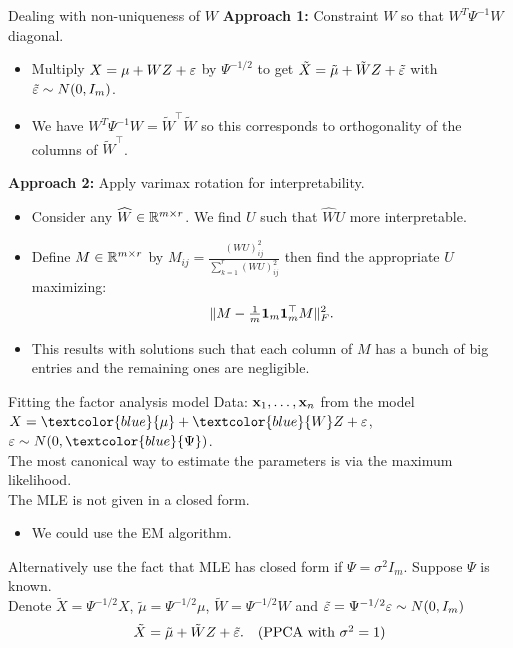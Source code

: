 \documentclass[11pt,handout,aspectratio=169]{beamer}
\begin{document}
\begin{frame}{Dealing with non-uniqueness of $W$}
\textbf{Approach 1: } Constraint $W$ so that $W^T\Psi^{-1}W$ diagonal.
    \begin{itemize}
        \item Multiply $X=\mu+WZ+\varepsilon$ by $\Psi^{-1/2}$ to get $\tilde X=\tilde \mu+\tilde WZ+\tilde {\varepsilon}$ with $\tilde{\varepsilon}\sim N(0,I_m)$.
        \item We have $W^T\Psi^{-1}W=\tilde W^\top \tilde W$ so this corresponds to orthogonality of the columns of $\tilde W^\top$.
    \end{itemize}
    \bigskip
    
    \textbf{Approach 2: } Apply \alert{varimax rotation} for interpretability.
    \begin{itemize}
    	\item Consider any $\widehat W\in \mathbb R^{m\times r}$. We find $U$ such that $\widehat WU$ more interpretable. 
    	\item Define $M\in \mathbb R^{m\times r}$ by $M_{ij}=\frac{(WU)_{ij}^2}{\sum_{k=1}^r (WU)_{ij}^2}$ then find the appropriate $U$ maximizing: 
    	$$\|M-\tfrac1m \boldsymbol 1_m\boldsymbol 1_m^\top M\|^2_F.$$
    	\item This results with solutions such that each column of $M$ has a bunch of big entries and the remaining ones are negligible.
    \end{itemize}
\end{frame}

\begin{frame}{Fitting the factor analysis model}
Data: $\mathbf{x}_1,\ldots,\mathbf{x}_n$ from the model $X=\textcolor{blue}{\mu}+\textcolor{blue}{W}Z+\eps$, $\eps\sim N(0,\textcolor{blue}{\Psi})$.\\[3mm]
	The most canonical way to estimate the parameters is via the maximum likelihood. \\[3mm]
	The MLE is not given in a closed form. 
	\begin{itemize}
		\item We could use the EM algorithm.
	\end{itemize}
	\begin{block}{Alternatively use the fact that MLE has closed form if $\Psi=\sigma^2 I_m$.}
	Suppose $\Psi$ is known.\\[3mm] Denote $\tilde X=\Psi^{-1/2}X$, $\tilde \mu=\Psi^{-1/2}\mu$, $\tilde W=\Psi^{-1/2}W$ and $\tilde{\varepsilon} =\Psi^{-1/2}\varepsilon\sim N(0,I_m)$
	$$\tilde X=\tilde \mu+\tilde W Z+\tilde {\varepsilon}. \quad(\mbox{PPCA with $\sigma^2=1$})$$
	\end{block}
\end{frame}
\end{document}
